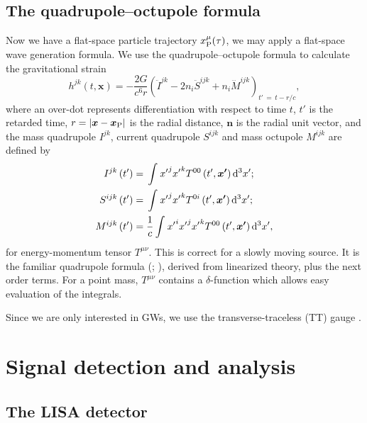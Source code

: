 \subsection{The quadrupole--octupole formula}

Now we have a flat-space particle trajectory $x_\mathrm{P}^\mu(\tau)$, we may apply a flat-space wave generation formula. We use the quadrupole--octupole formula to calculate the gravitational strain \citep{Bekenstein1973, Press1977, Yunes2008}
\begin{equation}
h^{jk}(t, \boldsymbol{x}) = -\dfrac{2G}{c^6r}\left(\ddot{I}^{jk} - 2n_i\ddot{S}^{ijk} + n_i\dddot{M}^{ijk}\right)_{t'\, =\, t - r/c},
\label{eq:octupole}
\end{equation}
where an over-dot represents differentiation with respect to time $t$, $t'$ is the retarded time, $r = \left|\boldsymbol{x} - \boldsymbol{x}_\mathrm{P}\right|$ is the radial distance, $\boldsymbol{n}$ is the radial unit vector, and the mass quadrupole ${I}^{jk}$, current quadrupole ${S}^{ijk}$ and mass octupole ${M}^{ijk}$ are defined by
\begin{subequations}
\begin{align}
{I}^{jk}\left(t'\right) = {} & \int_{}^{}{{x'}^j{x'}^kT^{00}\left(t', \boldsymbol{x'}\right) }\,\mathrm{d}{^3x'};\\
{S}^{ijk}\left(t'\right) = {} & \int_{}^{}{{x'}^j{x'}^kT^{0i}\left(t', \boldsymbol{x'}\right)}\,\mathrm{d}{^3x'};\\
{M}^{ijk}\left(t'\right)  = {} & \dfrac{1}{c}\int_{}^{}{{x'}^i{x'}^j{x'}^kT^{00}\left(t', \boldsymbol{x'}\right)}\,\mathrm{d}{^3x'},
\end{align}
\end{subequations}
for energy-momentum tensor $T^{\mu\nu}$. This is correct for a slowly moving source. It is the familiar quadrupole formula \linebreak[0] (\citealt[section 36.10]{Misner1973}; \citealt[section 17.9]{Hobson2006}), derived from linearized theory, plus the next order terms. For a point mass, $T^{\mu\nu}$ contains a $\delta$-function which allows easy evaluation of the integrals.

Since we are only interested in GWs, we use the transverse-traceless (TT) gauge \citep[box 35.1]{Misner1973}.

\section{Signal detection and analysis}\label{sec:Signal}

\subsection{The LISA detector}\label{sec:Detector}

